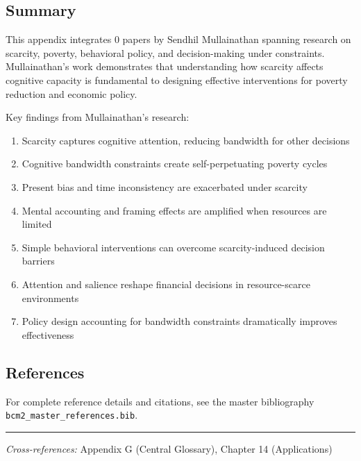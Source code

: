 \subsection{Summary}

This appendix integrates 0 papers by Sendhil Mullainathan spanning research on scarcity, poverty, behavioral policy, and decision-making under constraints. Mullainathan's work demonstrates that understanding how scarcity affects cognitive capacity is fundamental to designing effective interventions for poverty reduction and economic policy.

Key findings from Mullainathan's research:

\begin{enumerate}
  \item Scarcity captures cognitive attention, reducing bandwidth for other decisions
  \item Cognitive bandwidth constraints create self-perpetuating poverty cycles
  \item Present bias and time inconsistency are exacerbated under scarcity
  \item Mental accounting and framing effects are amplified when resources are limited
  \item Simple behavioral interventions can overcome scarcity-induced decision barriers
  \item Attention and salience reshape financial decisions in resource-scarce environments
  \item Policy design accounting for bandwidth constraints dramatically improves effectiveness
\end{enumerate}

\subsection{References}

For complete reference details and citations, see the master bibliography
\texttt{bcm2\_master\_references.bib}.

\vspace{1em}
\hrule
\vspace{0.5em}

\noindent\textit{Cross-references:}
Appendix G (Central Glossary), Chapter 14 (Applications)
